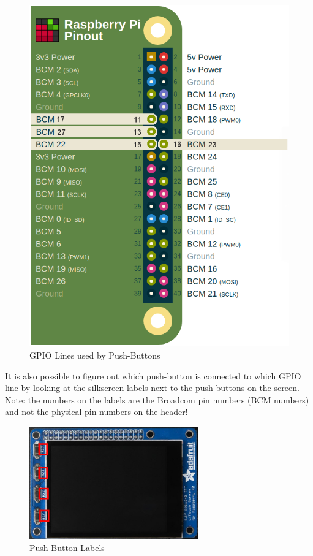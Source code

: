 \documentclass{article}
\begin{document}
	\begin{figure}[H]
		\centering
		\includegraphics[scale=0.3]{pics/PiTFT_2-8_Switches_GPIO.png}
		\caption{GPIO Lines used by Push-Buttons}
		\label{Push_buttons_GPIO}
	\end{figure}


It is also possible to figure out which push-button is connected to which GPIO line by looking at the silkscreen labels next to the push-buttons on the screen. Note: the numbers on the labels are the Broadcom pin numbers (BCM numbers) and not the physical pin numbers on the header!



	\begin{figure}[H]
		\centering
		\includegraphics[width=0.65\textwidth]{pics/PiTFT_Plus_2_8_Overhead.jpg}
		\caption{Push Button Labels}
		\label{Push_Button_Labels}
	\end{figure}
\end{document}
